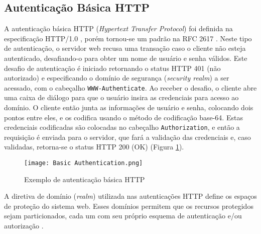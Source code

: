 \subsection{Autenticação Básica HTTP}

A autenticação básica HTTP (\emph{Hypertext Transfer Protocol}) foi definida na especificação
HTTP/1.0 \cite{RFC1945}, porém tornou-se um padrão na RFC 2617 \cite{RFC2617}. Neste tipo de
autenticação, o servidor web recusa uma transação caso o cliente não esteja autenticado,
desafiando-o para obter um nome de usuário e senha válidos. Este desafio de autenticação é iniciado
retornando o status HTTP 401 (não autorizado) e especificando o domínio de segurança
(\emph{security realm}) a ser acessado, com o cabeçalho \texttt{WWW-Authenticate}. Ao receber o 
desafio, o cliente abre uma caixa de diálogo para que o usuário insira as credenciais para acesso 
ao domínio. O cliente então junta as informações de usuário e senha, colocando dois pontos entre 
eles, e os codifica usando o método de codificação base-64. Estas credenciais codificadas são 
colocadas no cabeçalho \texttt{Authorization}, e então a requisição é enviada para o servidor, que 
fará a validação das credenciais e, caso validadas, retorna-se o status HTTP 200 (OK) 
\cite{GOURLEY2002} (Figura \ref{fig:basicAuth}).

\begin{figure}[ht]
  \centering
  \texttt{[image: Basic Authentication.png]}
  \caption{Exemplo de autenticação básica HTTP}
  \label{fig:basicAuth}
\end{figure}

A diretiva de domínio (\emph{realm}) utilizada nas autenticações HTTP define os espaços de proteção 
do sistema web. Esses domínios permitem que os recursos protegidos sejam particionados, cada um com 
seu próprio esquema de autenticação e/ou autorização \cite{RFC2617}.